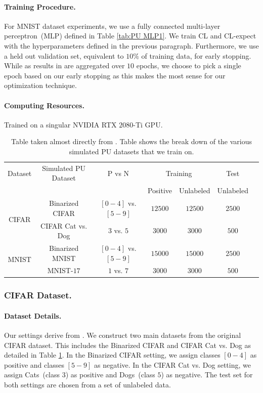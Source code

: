 \documentclass{article}
\begin{document}
\paragraph{Training Procedure.}For MNIST dataset experiments, we use a fully connected multi-layer perceptron~(MLP) defined in Table \ref{tab:PU MLP1}. We train CL and CL-expect with the hyperparameters defined in the previous paragraph. Furthermore, we use a held out validation set, equivalent to $10\%$ of training data, for early stopping. While as results in \citet{garg2021mixture} are aggregated over $10$ epochs, we choose to pick a single epoch based on our early stopping as this makes the most sense for our optimization technique.

\paragraph{Computing Resources.} Trained on a singular NVIDIA RTX $2080$-Ti GPU.

\begin{table}[h]
    \centering
    \caption{Table taken almost directly from \citet{garg2021mixture}. Table shows the break down of the various simulated PU datasets that we train on.}
    \begin{tabular}{ccccccc}
        \toprule
         Dataset & Simulated PU Dataset & P vs N & \multicolumn{2}{c}{Training} & Test\\
         & & & Positive & Unlabeled & Unlabeled\\ 
         \midrule
         \multirow{2}{*}{CIFAR} & Binarized CIFAR & $[0 - 4]$ vs. $[5 - 9]$ & $12500$ & $12500$ & $2500$\\
         & CIFAR Cat vs. Dog & $3$ vs. $5$ & $3000$ & $3000$ & $500$\\
         \multirow{2}{*}{MNIST} & Binarized MNIST & $[0 - 4]$ vs. $[5 - 9]$ & $15000$ & $15000$ & $2500$\\
         & MNIST-$17$ & $1$ vs. $7$ & $3000$ & $3000$ & $500$\\
         \bottomrule
    \end{tabular}
    \label{tab:PU dataset}
\end{table}

\subsubsection{CIFAR Dataset.} 
\paragraph{Dataset Details.} Our settings derive from \citet{garg2021mixture}. We construct two main datasets from the original CIFAR dataset. This includes the Binarized CIFAR and CIFAR Cat vs. Dog as detailed in Table \ref{tab:PU dataset}. In the Binarized CIFAR setting, we assign classes $[0 - 4]$ as positive and classes $[5 - 9]$ as negative. In the CIFAR Cat vs. Dog setting, we assign Cats~(class $3$) as positive and Dogs~(class $5$) as negative. The test set for both settings are chosen from a set of unlabeled data.
\end{document}
